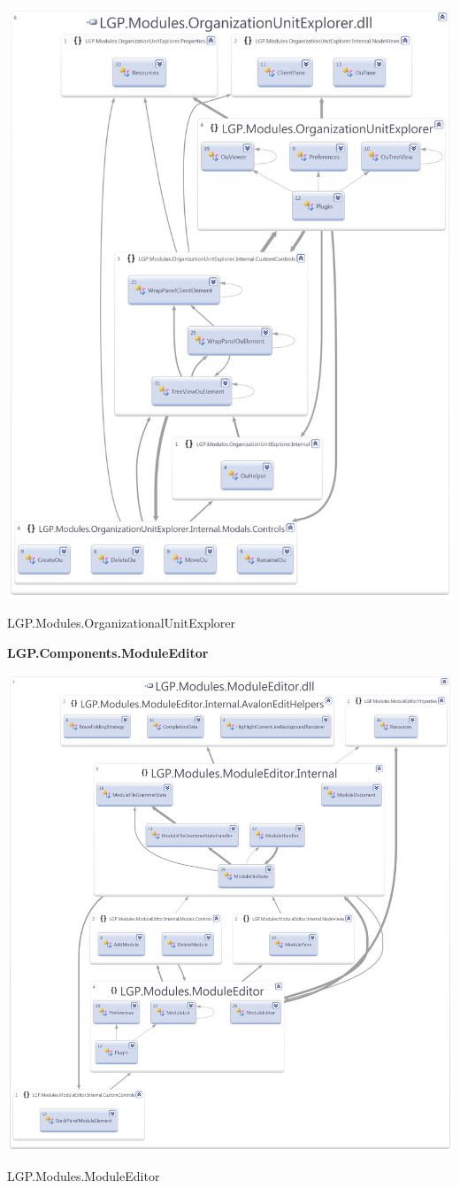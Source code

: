 		\begin{figurehere}
			\centering
			\includegraphics[scale=0.70]{pages/appendix3/figures/dllscreens/ou.png}
			\caption{LGP.Modules.OrganizationalUnitExplorer}
		\end{figurehere}
	

\newpage
	
	
	\large{\bfseries{LGP.Components.ModuleEditor}}
	\vspace{5mm}
	
		\begin{figurehere}
			\centering
			\includegraphics[scale=0.6]{pages/appendix3/figures/dllscreens/moduleeditor.png}
			\caption{LGP.Modules.ModuleEditor}
		\end{figurehere}
				
		
\newpage